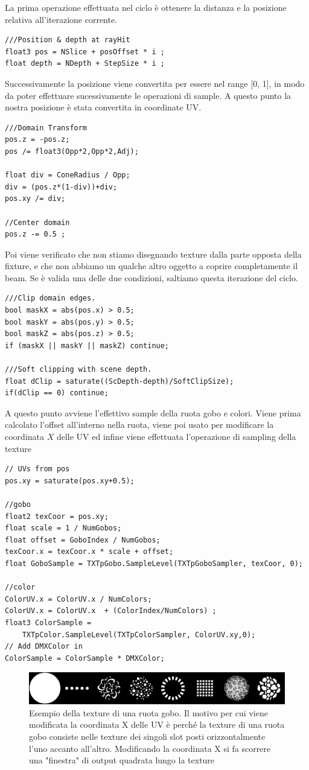\documentclass[main.tex]{subfiles}
\begin{document}
La prima operazione effettuata nel ciclo è ottenere la distanza e la posizione relativa all'iterazione corrente.
\begin{lstlisting}
///Position & depth at rayHit
float3 pos = NSlice + posOffset * i ;
float depth = NDepth + StepSize * i ;
\end{lstlisting}
Successivamente la posizione viene convertita per essere nel range [0, 1], in modo da poter effettuare sucessivamente le operazioni di sample. A questo punto la nostra posizione è stata convertita in coordinate UV.
\begin{lstlisting}
///Domain Transform
pos.z = -pos.z;
pos /= float3(Opp*2,Opp*2,Adj);

float div = ConeRadius / Opp;
div = (pos.z*(1-div))+div;
pos.xy /= div;

//Center domain
pos.z -= 0.5 ;
\end{lstlisting}
Poi viene verificato che non stiamo disegnando texture dalla parte opposta della fixture, e che non abbiamo un qualche altro oggetto a coprire completamente il beam. Se è valida una delle due condizioni, saltiamo questa iterazione del ciclo.
\begin{lstlisting}
///Clip domain edges.
bool maskX = abs(pos.x) > 0.5;
bool maskY = abs(pos.y) > 0.5;
bool maskZ = abs(pos.z) > 0.5;
if (maskX || maskY || maskZ) continue;

///Soft clipping with scene depth.
float dClip = saturate((ScDepth-depth)/SoftClipSize);
if(dClip == 0) continue;
\end{lstlisting}
A questo punto avviene l'effettivo sample della ruota gobo e colori. Viene prima calcolato l'offset all'interno nella ruota, viene poi usato per modificare la coordinata $X$ delle UV ed infine viene effettuata l'operazione di sampling della texture
\begin{lstlisting}
// UVs from pos
pos.xy = saturate(pos.xy+0.5);

//gobo
float2 texCoor = pos.xy;
float scale = 1 / NumGobos;
float offset = GoboIndex / NumGobos;
texCoor.x = texCoor.x * scale + offset;
float GoboSample = TXTpGobo.SampleLevel(TXTpGoboSampler, texCoor, 0);

//color
ColorUV.x = ColorUV.x / NumColors;
ColorUV.x = ColorUV.x  + (ColorIndex/NumColors) ;
float3 ColorSample =
    TXTpColor.SampleLevel(TXTpColorSampler, ColorUV.xy,0);
// Add DMXColor in
ColorSample = ColorSample * DMXColor;
\end{lstlisting}
\begin{figure}[H]
    \centering
    \includegraphics[width=1\linewidth]{img/renderingPipeline/Wheel_Rotating_Gobo_Wheel.jpg}
    \caption{Esempio della texture di una ruota gobo. Il motivo per cui viene modificata la coordinata X delle UV è perché la texture di una ruota gobo consiste nelle texture dei singoli slot posti orizzontalmente l'uno accanto all'altro. Modificando la coordinata X si fa scorrere una "finestra" di output quadrata lungo la texture}
    \label{fig:2_goboWheel}
\end{figure}
\end{document}
